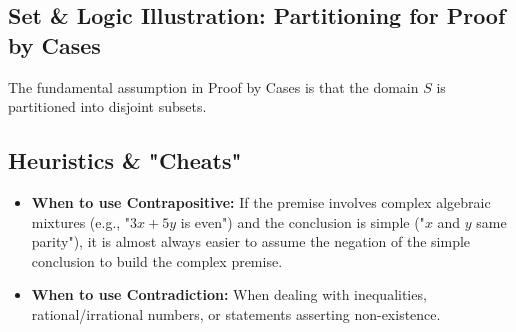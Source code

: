 \documentclass[11pt, letterpaper]{article}
\theoremstyle{definition}
\theoremstyle{remark}
\newcommand{\Z}{\mathbb{Z}}
\begin{document}
\subsection{Set \& Logic Illustration: Partitioning for Proof by Cases}
The fundamental assumption in Proof by Cases is that the domain $S$ is partitioned into disjoint subsets.
\begin{center}
\end{center}

\subsection{Heuristics \& "Cheats"}
\begin{itemize}
    \item \textbf{When to use Contrapositive:} If the premise involves complex algebraic mixtures (e.g., "$3x+5y$ is even") and the conclusion is simple ("$x$ and $y$ same parity"), it is almost always easier to assume the negation of the simple conclusion to build the complex premise.
    \item \textbf{When to use Contradiction:} When dealing with inequalities, rational/irrational numbers, or statements asserting non-existence.
\end{itemize}
\end{document}
